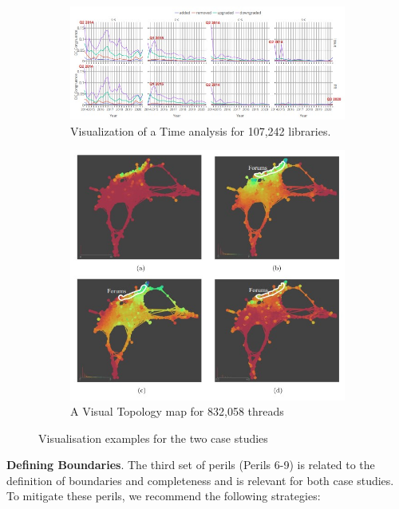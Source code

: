 \begin{figure}[]
    \centering
    \begin{subfigure}{0.9\linewidth}
         \includegraphics[width=1.1\textwidth]{book/chapter-promisesandperils/pics/congruentViz.jpg}
         \caption{Visualization of a Time analysis for 107,242 libraries.}
     \end{subfigure}
     \begin{subfigure}{0.9\linewidth}
         \includegraphics[width=1\textwidth]{book/chapter-promisesandperils/pics/eclipseViz.jpg}
         \caption{A Visual Topology map for 832,058 threads}
     \end{subfigure}
    \caption{Visualisation examples for the two case studies}
    \label{fig:visCase}
\end{figure}

\smallskip\noindent\textbf{Defining Boundaries}.
The third set of perils (Perils 6-9) is related to the definition of boundaries and completeness and is relevant for both case studies. To mitigate these perils, we recommend the following strategies:

